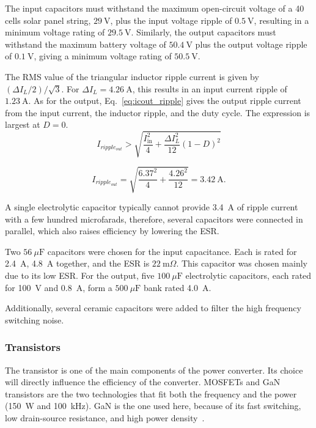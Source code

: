 \documentclass[conference]{IEEEtran}
\begin{document}
    The input capacitors must withstand the maximum open-circuit voltage of a 40 cells solar panel string, $29~\mathrm{V}$, plus the input voltage ripple of $0.5~\mathrm{V}$, resulting in a minimum voltage rating of $29.5~\mathrm{V}$. Similarly, the output capacitors must withstand the maximum battery voltage of $50.4~\mathrm{V}$ plus the output voltage ripple of $0.1~\mathrm{V}$, giving a minimum voltage rating of $50.5~\mathrm{V}$.

    The RMS value of the triangular inductor ripple current is given by $(\Delta I_L/2)/\sqrt{3}$. For $\Delta I_L = 4.26~\mathrm{A}$, this results in an input current ripple of $1.23~\mathrm{A}$. As for the output, Eq.~\eqref{eq:icout_ripple} gives the output ripple current from the input current, the inductor ripple, and the duty cycle. The expression is largest at $D = 0$.
    \begin{equation}
        I_{ripple_{out}} > \sqrt{\frac{I_{\mathrm{in}}^{2}}{4} + \frac{\Delta I_L^{2}}{12}(1-D)^2}  
        \label{eq:icout_ripple}
    \end{equation}
        
    \begin{equation}
        I_{ripple_{out}} = \sqrt{\frac{6.37^{2}}{4} + \frac{4.26^{2}}{12}} = 3.42~\mathrm{A}.
    \end{equation}

    A single electrolytic capacitor typically cannot provide 3.4~A of ripple current with a few hundred microfarads, therefore, several capacitors were connected in parallel, which also raises efficiency by lowering the ESR.

    Two $56~\mu\mathrm{F}$ capacitors were chosen for the input capacitance. Each is rated for 2.4~A, 4.8~A together, and the ESR is $22~\mathrm{m}\Omega$. This capacitor was chosen mainly due to its low ESR. For the output, five $100~\mu\mathrm{F}$ electrolytic capacitors, each rated for 100~V and 0.8~A, form a $500~\mu\mathrm{F}$ bank rated 4.0~A.

    Additionally, several ceramic capacitors were added to filter the high frequency switching noise.

    \subsubsection{Transistors}
    The transistor is one of the main components of the power converter. Its choice will directly influence the efficiency of the converter. MOSFETs and GaN transistors are the two technologies that fit both the frequency and the power (150~W and 100~kHz). GaN is the one used here, because of its fast switching, low drain-source resistance, and high power density~\cite{talat2024igbt}.
\end{document}
